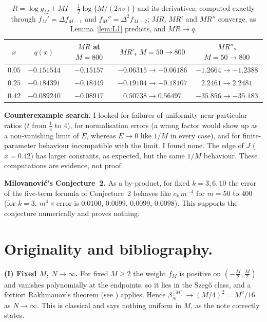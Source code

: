 \documentclass[11pt,a4paper]{article}
\theoremstyle{remark}
\numberwithin{equation}{section}
\begin{document}
\begin{table}[h]
\centering
\begin{tabular}{@{}ccccc@{}}
\toprule
$x$ & $q(x)$ & $MR$ at $M=800$ & $MR'$, $M=50\to800$ & $MR''$, $M=50\to800$\\
\midrule
$0.05$ & $-0.151544$ & $-0.15157$ & $-0.06315\to-0.06186$ & $-1.2664\to-1.2388$\\
$0.25$ & $-0.184391$ & $-0.18449$ & $-0.19104\to-0.18107$ & $2.2461\to2.2481$\\
$0.42$ & $-0.089240$ & $-0.08917$ & $0.50738\to0.56497$ & $-35.856\to-35.183$\\
\bottomrule
\end{tabular}
\caption{$R=\log g_M+MI-\frac12\log\{M/(2\pi v)\}$ and its derivatives, computed exactly
through $f_M'=\Delta f_{M-1}$ and $f_M''=\Delta^2f_{M-2}$; $MR$, $MR'$ and $MR''$ converge,
as Lemma~\ref{lem:L1} predicts, and $MR\to q$.}\label{tab:saddle}
\end{table}

\textbf{Counterexample search.} I looked for failures of uniformity near particular ratios
($t$ from $\frac14$ to $4$), for normalisation errors (a wrong factor would show up as a
non-vanishing limit of $E$, whereas $E\to0$ like $1/M$ in every case), and for
finite-parameter behaviour incompatible with the limit. I found none. The edge of $J$
($x=0.42$) has larger constants, as expected, but the same $1/M$ behaviour. These
computations are evidence, not proof.

\textbf{Milovanovi\'c's Conjecture~2.} As a by-product, for fixed $k=3,6,10$ the error of
the five-term formula of Conjecture~2 behaves like $c_k\,m^{-4}$ for $m=50$ to $400$ (for
$k=3$, $m^4\times\text{error}$ is $0.0100$, $0.0099$, $0.0099$, $0.0098$). This supports the
conjecture numerically and proves nothing.

\section{Originality and bibliography.}\label{sec:orig}

\textbf{(I) Fixed $M$, $N\to\infty$.} For fixed $M\ge2$ the weight $f_M$ is positive on
$(-\frac M2,\frac M2)$ and vanishes polynomially at the endpoints, so it lies in the Szeg\H{o}
class, and a fortiori Rakhmanov's theorem (see \cite{denisov2004}) applies. Hence
$\beta_N^{[M]}\to(M/4)^2=M^2/16$ as $N\to\infty$. This is classical and says nothing uniform
in $M$, as the note correctly states.
\end{document}
